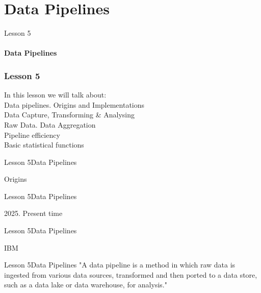 \documentclass[aspectratio=1610]{beamer}
\begin{document}
\section{Data Pipelines}

\begin{frame}
\begin{center}
\Huge Lesson 5\\~\\
\textbf{Data Pipelines}
\end{center}
\end{frame}


\begin{frame}
\frametitle{Lesson 5}
\Huge In this lesson we will talk about:\\
\huge
 \alert{Data pipelines. Origins and Implementations}\\
 \alert{Data Capture, Transforming \& Analysing}\\
 \alert{Raw Data. Data Aggregation}\\
 \alert{Pipeline efficiency}\\
 \alert{Basic statistical functions}
\end{frame}


\begin{frame}{Lesson 5}{Data Pipelines}
\Huge
\begin{center}
Origins
\end{center}
\end{frame}


\begin{frame}{Lesson 5}{Data Pipelines}
\Huge
\begin{center}
2025. Present time 
\end{center}
\end{frame}



\begin{frame}{Lesson 5}{Data Pipelines}
\Huge
\begin{center}
 IBM
\end{center}
\end{frame}

\begin{frame}{Lesson 5}{Data Pipelines}
\LARGE
"A data pipeline is a method in which raw data is ingested from 
various data sources, transformed and then ported to a data store, 
such as a data lake or data warehouse, for analysis."
\end{frame}
\end{document}
